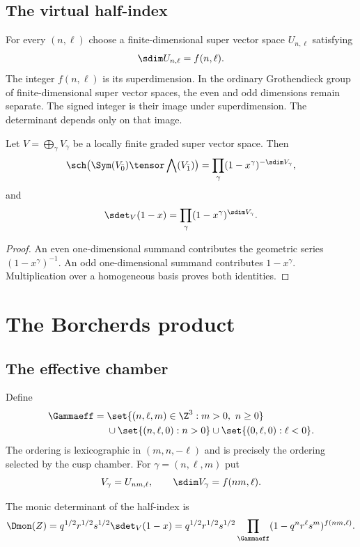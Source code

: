 \section{The virtual half-index}
For every $(n,\ell)$ choose a finite-dimensional super vector space $U_{n,\ell}$ satisfying
\[
 \sdim U_{n,\ell}=f(n,\ell).
\]
The integer \(f(n,\ell)\) is its superdimension. In the ordinary
Grothendieck group of finite-dimensional super vector spaces, the
even and odd dimensions remain separate. The signed integer is their
image under superdimension. The determinant depends only on that image.

\begin{lemma}
Let $V=\bigoplus_{\gamma}V_\gamma$ be a locally finite graded super vector space. Then
\[
 \sch\bigl(\Sym(V_{\bar0})\tensor\bigwedge(V_{\bar1})\bigr)
 =\prod_\gamma(1-x^\gamma)^{-\sdim V_\gamma},
\]
and
\[
 \sdet_V(1-x)=\prod_\gamma(1-x^\gamma)^{\sdim V_\gamma}.
\]
\end{lemma}
\begin{proof}
An even one-dimensional summand contributes the geometric series $(1-x^\gamma)^{-1}$. An odd one-dimensional summand contributes $1-x^\gamma$. Multiplication over a homogeneous basis proves both identities.
\end{proof}

\chapter{The Borcherds product}
\section{The effective chamber}
Define
\[
\begin{aligned}
\Gammaeff={}&\set{(n,\ell,m)\in\Z^3:m>0,\ n\ge0}\\
&\cup\set{(n,\ell,0):n>0}
 \cup\set{(0,\ell,0):\ell<0}.
\end{aligned}
\]
The ordering is lexicographic in $(m,n,-\ell)$ and is precisely the ordering selected by the cusp chamber.
For $\gamma=(n,\ell,m)$ put
\[
 V_\gamma=U_{nm,\ell},
 \qquad \sdim V_\gamma=f(nm,\ell).
\]

\begin{definition}
The monic determinant of the half-index is
\[
 \Dmon(Z)=q^{1/2}r^{1/2}s^{1/2}
 \sdet_V(1-x)
 =q^{1/2}r^{1/2}s^{1/2}
 \prod_{\Gammaeff}(1-q^nr^\ell s^m)^{f(nm,\ell)}.
\]
\end{definition}

